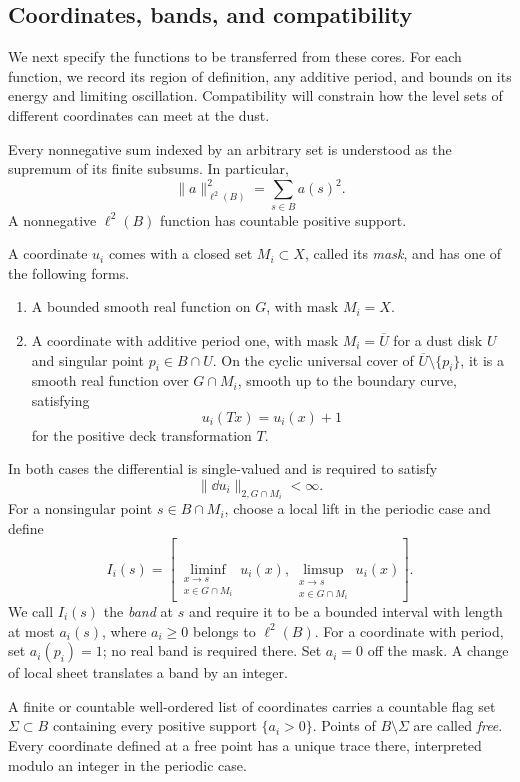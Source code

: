 \subsection{Coordinates, bands, and compatibility}

We next specify the functions to be transferred from these cores.
For each function, we record its region of definition, any additive
period, and bounds on its energy and limiting oscillation.
Compatibility will constrain how the level sets of different
coordinates can meet at the dust.

Every nonnegative sum indexed by an arbitrary set is understood as
the supremum of its finite subsums.  In particular,
\[
 \|a\|_{\ell^2(B)}^2=\sum_{s\in B}a(s)^2.
\]
A nonnegative $\ell^2(B)$ function has countable positive support.

\begin{definition}[Coordinates]\label{def:coordinates}
A coordinate $u_i$ comes with a closed set $M_i\subset X$, called its
\emph{mask}, and has one of the following forms.
\begin{enumerate}[label=\textup{(\roman*)}]
\item A bounded smooth real function on $G$, with mask $M_i=X$.
\item A coordinate with additive period one, with mask
$M_i=\overline U$ for a dust disk $U$ and singular point
$p_i\in B\cap U$.  On the cyclic universal cover of
$\overline U\setminus\{p_i\}$, it is a smooth real function over
$G\cap M_i$, smooth up to the boundary curve, satisfying
\[
 u_i(Tx)=u_i(x)+1
\]
for the positive deck transformation $T$.
\end{enumerate}
In both cases the differential is single-valued and is required to
satisfy
\[
 \|\dd u_i\|_{2,G\cap M_i}<\infty.
\]
For a nonsingular point $s\in B\cap M_i$, choose a local lift in the
periodic case and define
\[
 I_i(s)=
 \left[\liminf_{\substack{x\to s\\x\in G\cap M_i}}u_i(x),
       \limsup_{\substack{x\to s\\x\in G\cap M_i}}u_i(x)\right].
\]
We call $I_i(s)$ the \emph{band} at $s$ and require it to be a bounded
interval with length at most $a_i(s)$, where $a_i\ge0$ belongs to
$\ell^2(B)$.
For a coordinate with period, set $a_i(p_i)=1$; no real band is
required there.  Set $a_i=0$ off the mask.  A change of local sheet
translates a band by an integer.

A finite or countable well-ordered list of coordinates carries a
countable flag set $\Sigma\subset B$ containing every positive
support $\{a_i>0\}$.  Points of $B\setminus\Sigma$ are called
\emph{free}.  Every coordinate defined at a free point has a unique
trace there, interpreted modulo an integer in the periodic case.
\end{definition}

